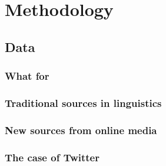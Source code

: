 \documentclass[../thesis.tex]{subfiles}
\begin{document}
\chapter{Methodology}
\label{ch:methods}







\section{Data}

\subsection{What for}

\subsection{Traditional sources in linguistics}

\subsection{New sources from online media}

\subsection{The case of Twitter}
\end{document}
